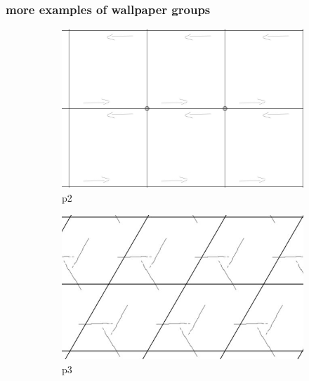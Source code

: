 \documentclass{beamer}
\theoremstyle{definition}
\begin{document}
\begin{frame}
\frametitle{more examples of wallpaper groups}
    \begin{figure}
     \centering
     \begin{subfigure}[b]{0.3\textwidth}
         \centering
         \includegraphics[width=\textwidth]{Figures/p_examples/p_2_simple.JPG}
         \caption{p2}
         \label{fig: p2}
     \end{subfigure}
     \hfill
     \begin{subfigure}[b]{0.3\textwidth}
         \centering
         \includegraphics[width=\textwidth]{Figures/p_examples/p_3_simple.JPG}
         \caption{p3}
         \label{fig:p3}
     \end{subfigure}
     \vfill
     \begin{subfigure}[b]{0.3\textwidth}
         \centering

\end{subfigure}
\end{figure}
\end{frame}
\end{document}

